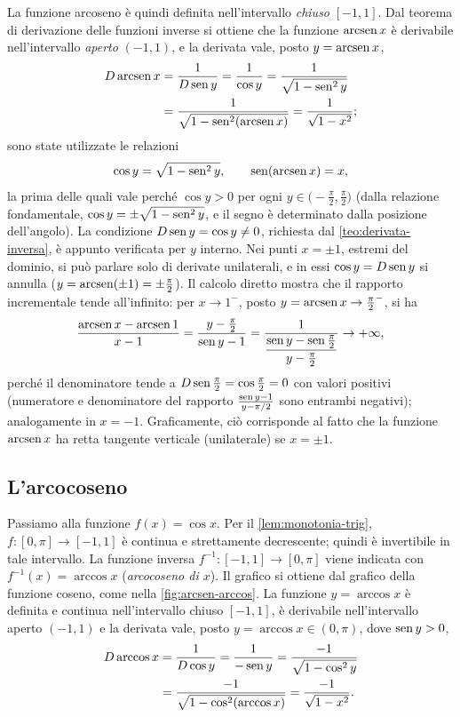 La funzione arcoseno è quindi definita nell'intervallo \emph{chiuso} $[-1,1]$. Dal teorema
di derivazione delle funzioni inverse si ottiene che la funzione $\operatorname{arcsen} x$ è derivabile
nell'intervallo \emph{aperto} $(-1,1)$, e la derivata vale, posto $y=\operatorname{arcsen} x$,
\begin{equation}\label{eq:derivata-arcsen}
\begin{split}
  D\operatorname{arcsen} x&=\frac1{D\operatorname{sen} y}=\frac1{\cos y}=\frac1{\sqrt{1-\operatorname{sen}^{2}y}}\\
  &=\frac1{\sqrt{1-\operatorname{sen}^{2}(\operatorname{arcsen} x)}}=\frac1{\sqrt{1-x^{2}}};
\end{split}
\end{equation}
sono state utilizzate le relazioni
\begin{equation}\label{eq:relazioni-arcsen}
  \cos y=\sqrt{1-\operatorname{sen}^{2}y}, \qquad \operatorname{sen}(\operatorname{arcsen} x)=x,
\end{equation}
la prima delle quali vale perché $\cos y>0$ per ogni $y\in\bigl(-\frac\pi2,\frac\pi2\bigr)$
(dalla relazione fondamentale, $\cos y=\pm\sqrt{1-\operatorname{sen}^{2}y}$, e il segno è determinato
dalla posizione dell'angolo). La condizione $D\operatorname{sen} y=\cos y\neq0$, richiesta dal
\cref{teo:derivata-inversa}, è appunto verificata per $y$ interno. Nei punti $x=\pm1$, estremi del dominio, si può parlare solo di derivate
unilaterali, e in essi $\cos y=D\operatorname{sen} y$ si annulla ($y=\operatorname{arcsen}(\pm1)=\pm\frac\pi2$). Il
calcolo diretto mostra che il rapporto incrementale tende all'infinito: per $x\to1^{-}$,
posto $y=\operatorname{arcsen} x\to\frac\pi2^{-}$, si ha
\[
  \frac{\operatorname{arcsen} x-\operatorname{arcsen}1}{x-1}=\frac{y-\frac\pi2}{\operatorname{sen} y-1}
  =\frac1{\dfrac{\operatorname{sen} y-\operatorname{sen}\frac\pi2}{y-\frac\pi2}}\to+\infty,
\]
perché il denominatore tende a $D\operatorname{sen}\frac\pi2=\cos\frac\pi2=0$ con valori positivi
(numeratore e denominatore del rapporto $\frac{\operatorname{sen} y-1}{y-\pi/2}$ sono entrambi negativi);
analogamente in $x=-1$. Graficamente, ciò corrisponde al fatto che la funzione
$\operatorname{arcsen} x$ ha retta tangente verticale (unilaterale) se $x=\pm1$.

\subsection{L'arcocoseno}

Passiamo alla funzione $f(x)=\cos x$. Per il \cref{lem:monotonia-trig}, $f:[0,\pi]\to[-1,1]$
è continua e strettamente decrescente; quindi è invertibile in tale intervallo. La
funzione inversa $f^{-1}:[-1,1]\to[0,\pi]$ viene indicata con $f^{-1}(x)=\arccos x$
(\emph{arcocoseno di $x$}). Il grafico si ottiene dal grafico della funzione coseno, come
nella \cref{fig:arcsen-arccos}. La funzione $y=\arccos x$ è definita e continua
nell'intervallo chiuso $[-1,1]$, è derivabile nell'intervallo aperto $(-1,1)$ e la derivata
vale, posto $y=\arccos x\in(0,\pi)$, dove $\operatorname{sen} y>0$,
\begin{equation}\label{eq:derivata-arccos}
\begin{split}
  D\arccos x&=\frac1{D\cos y}=\frac1{-\operatorname{sen} y}=\frac{-1}{\sqrt{1-\cos^{2}y}}\\
  &=\frac{-1}{\sqrt{1-\cos^{2}(\arccos x)}}=\frac{-1}{\sqrt{1-x^{2}}} .
\end{split}
\end{equation}

